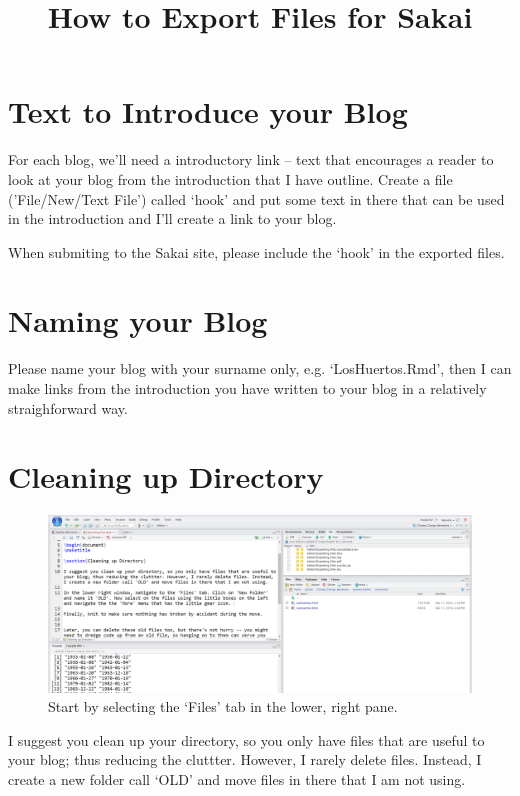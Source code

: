 \documentclass{article}\usepackage[]{graphicx}\usepackage[]{color}
\title{How to Export Files for Sakai}
\begin{document}
\maketitle

\section{Text to Introduce your Blog}

For each blog, we'll need a introductory link -- text that encourages a reader to look at your blog from the introduction that I have outline. Create a file ('File/New/Text File') called `hook' and put some text in there that can be used in the introduction and I'll create a link to your blog. 

When submiting to the Sakai site, please include the `hook' in the exported files.  

\section{Naming your Blog}

Please name your blog with your surname only, e.g. `LosHuertos.Rmd', then I can make links from the introduction you have written to your blog in a relatively straighforward way. 

\section{Cleaning up Directory}

\begin{figure}
\includegraphics[width=\textwidth]{FourWindows}
\caption{Start by selecting the `Files' tab in the lower, right pane.}
\end{figure}

I suggest you clean up your directory, so you only have files that are useful to your blog; thus reducing the cluttter. However, I rarely delete files. Instead, I create a new folder call `OLD' and move files in there that I am not using.
\end{document}
